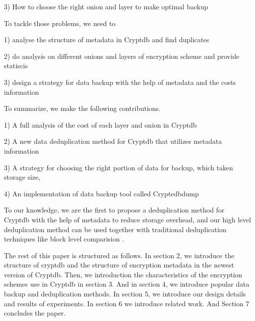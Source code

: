 3) How to choose the right onion and layer to make optimal backup


To tackle those problems, we need to

1) analyse the structure of metadata in Cryptdb and find duplicates

2) do analysis on different onions and layers of encryption scheme and provide statiscis

3) design a strategy for data backup with the help of metadata and the costs information 

To summarize, we make the following contributions.

1) A full analysis of the cost of each layer and onion in Cryptdb

2) A new data deduplication method for Cryptdb that utilizes metadata information 

3) A strategy for choosing the right portion of data for backup, which taken storage size, 

4) An implementation of data backup tool called Cryptedbdump 

To our knowledge, we are the first to propose a deduplication method for Cryptdb with the help of metadata to reduce storage overhead, and our high level deduplication method can be used together with traditional deduplication techniques like block level comparision \citep{bellare2013message}.

The rest of this paper is structured as follows. In section 2, we introduce the structure of cryptdb and the structure of encryption metadata in the newest version of Cryptdb. Then, we introduction the characteristics of the encryption schemes use in Cryptdb in section 3. And in section 4, we introduce popular data backup and deduplication methods. In section 5, we introduce our design details and results of experiments. In section 6 we introduce related work. And Section 7 concludes the paper.


